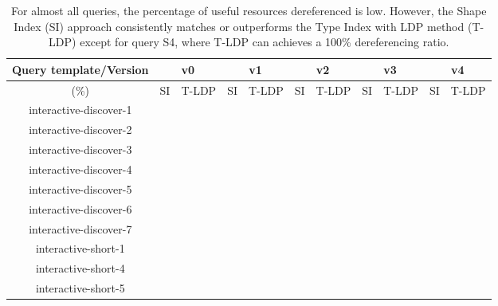 \begin{table}[htbp]
	\begin{center}
		\begin{tabular}{|c|c|c|c|c|c|c|c|c|c|c|}
			\hline
            \multicolumn{1}{|c}{Query template/Version} & \multicolumn{2}{|c|}{v0} & \multicolumn{2}{|c|}{v1} & \multicolumn{2}{|c|}{v2} & \multicolumn{2}{|c|}{v3} & \multicolumn{2}{|c|}{v4} \\
			\hline
            (\%) & SI  & T-LDP & SI & T-LDP & SI & T-LDP& SI & T-LDP & SI & T-LDP \\
            \hline
			interactive-discover-1 & {} & {} & {} & {} & {} & {} & {} & {} & {} & {} \\
            \hline
            interactive-discover-2 & {} & {} & {} & {} & {} & {} & {} & {} & {} & {} \\
			\hline
            interactive-discover-3 & {} & {} & {} & {} & {} & {} & {} & {} & {} & {} \\
			\hline
            interactive-discover-4 & {} & {} & {} & {} & {} & {} & {} & {} & {} & {} \\
			\hline
            interactive-discover-5 & {} & {} & {} & {} & {} & {} & {} & {} & {} & {} \\
			\hline
            interactive-discover-6 & {} & {} & {} & {} & {} & {} & {} & {} & {} & {} \\
			\hline
            interactive-discover-7 & {} & {} & {} & {} & {} & {} & {} & {} & {} & {} \\
			\hline
            interactive-short-1 & {} & {} & {} & {} & {} & {} & {} & {} & {} & {} \\
			\hline
            interactive-short-4 & {} & {} & {} & {} & {} & {} & {} & {} & {} & {} \\
			\hline
            interactive-short-5 & {} & {} & {} & {} & {} & {} & {} & {} & {} & {} \\
			\hline
		\end{tabular}
	\end{center}
	\caption{
        For almost all queries, the percentage of useful resources dereferenced is low. 
        However, the Shape Index (SI) approach consistently matches or outperforms the Type Index with LDP method (T-LDP) except for query S4, where T-LDP can achieves a 100\% dereferencing ratio.
        }
	\label{tab:ratioUsefulResources}
\end{table}